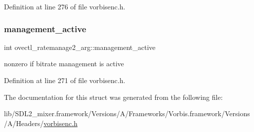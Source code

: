 Definition at line 276 of file vorbisenc.\+h.

\mbox{\label{structovectl__ratemanage2__arg_aca1f656373a1597177dac924578e375b}} 
\subsubsection{\texorpdfstring{management\_active}{management\_active}}
{\footnotesize\ttfamily int ovectl\+\_\+ratemanage2\+\_\+arg\+::management\+\_\+active}

nonzero if bitrate management is active 

Definition at line 271 of file vorbisenc.\+h.



The documentation for this struct was generated from the following file\+:\begin{DoxyCompactItemize}
\item 
lib/\+S\+D\+L2\+\_\+mixer.\+framework/\+Versions/\+A/\+Frameworks/\+Vorbis.\+framework/\+Versions/\+A/\+Headers/\mbox{\hyperlink{vorbisenc_8h}{vorbisenc.\+h}}\end{DoxyCompactItemize}
